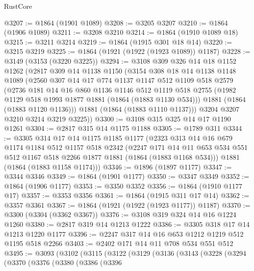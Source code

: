 \begin{lexlean}{RustCore}
\begin{coremodule}
@3207 := @1864 (@1901 @1089)
@3208 := @3205 @3207
@3210 := @1864 (@1906 @1089)
@3211 := @3208 @3210
@3214 := @1864 (@1910 @1089 @18)
@3215 := @3211 @3214
@3219 := @1864 (@1915 @301 @18 @14)
@3220 := @3215 @3219
@3225 := @1864 (@1921 (@1922 (@1923 @1089)) @1187)
@3228 := @3149 (@3153 (@3220 @3225))
@3294 := @3108
    @309
    @326
    @14
    @18
    @1152
    @1262
    (@2817
      @309
      @14
      @1138
      @1150
      (@3154
        @308
        @18
        @14
        @1138
        @1148
        @1089
        (@2560
          @307
          @14
          @17
          @774
          @1137
          @1147
          @512
          @1109
          @518
          @2579
          (@2736
            @181
            @14
            @16
            @860
            @1136
            @1146
            @512
            @1119
            @518
            @2755
            (@1982 @1129 @518 @1993 @1877 @1881 (@1864 (@1883 @1130 @534)))
            @1881
            (@1864 (@1883 @1120 @1136)))
          @1881
          (@1864 (@1883 @1110 @1137)))
        @3204
        @3207
        @3210
        @3214
        @3219
        @3225))
@3300 := @3108 @315 @325 @14 @17 @1190 @1261
@3304 := @2817 @315 @14 @1175 @1188
@3305 := @1789 @311
@3344 := @3305
    @314
    @17
    @14
    @1175
    @1185
    @1177
    (@2323
      @313
      @14
      @16
      @679
      @1174
      @1184
      @512
      @1157
      @518
      @2342
      (@2247
        @171
        @14
        @11
        @653
        @534
        @551
        @512
        @1167
        @518
        @2266
        @1877
        @1881
        (@1864 (@1883 @1168 @534)))
      @1881
      (@1864 (@1883 @1158 @1174)))
@3346 := @1896 (@1897 @1177)
@3347 := @3344 @3346
@3349 := @1864 (@1901 @1177)
@3350 := @3347 @3349
@3352 := @1864 (@1906 @1177)
@3353 := @3350 @3352
@3356 := @1864 (@1910 @1177 @17)
@3357 := @3353 @3356
@3361 := @1864 (@1915 @311 @17 @14)
@3362 := @3357 @3361
@3367 := @1864 (@1921 (@1922 (@1923 @1177)) @1187)
@3370 := @3300 (@3304 (@3362 @3367))
@3376 := @3108 @319 @324 @14 @16 @1224 @1260
@3380 := @2817 @319 @14 @1213 @1222
@3386 := @3305 @318 @17 @14 @1213 @1220 @1177
@3396 := @2247 @317 @14 @16 @653 @1212 @1219 @512 @1195 @518 @2266
@3403 := @2402 @171 @14 @11 @708 @534 @551 @512
@3495 := @3093
    (@3102
      (@3115
        (@3122
          (@3129
            (@3136
              (@3143
                (@3228
                  (@3294
                    (@3370
                      (@3376
                        (@3380
                          (@3386
                            (@3396

\end{coremodule}
\end{lexlean}
